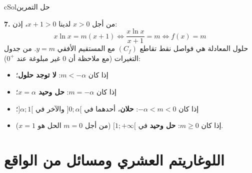 \documentclass[12pt,a4paper]{article}
\newcounter{exo}
\newenvironment{hal}{\Needspace{12\baselineskip}\begin{otherlanguage}{english}\begin{arbox}[breakable]{cSol}{حل التمرين \theexo}}{\end{arbox}\end{otherlanguage}}
\newcommand{\QQ}[1]{\par\smallskip\textbf{#1.} }
\begin{document}
\begin{hal}
\QQ{7} من أجل $x>0$ لدينا $x+1>0$، إذن:
\[x\ln x=m(x+1)\iff\frac{x\ln x}{x+1}=m\iff f(x)=m\]
حلول المعادلة هي فواصل نقط تقاطع $(C_f)$ مع المستقيم الأفقي $y=m$. من جدول التغيرات (مع ملاحظة أن $0$ غير مبلوغة عند $0^+$):
\begin{itemize}
\item إذا كان $m<-\alpha$: \textbf{لا توجد حلول}؛
\item إذا كان $m=-\alpha$: \textbf{حل وحيد $x=\alpha$}؛
\item إذا كان $-\alpha<m<0$: \textbf{حلان}، أحدهما في $]0;\alpha[$ والآخر في $]\alpha;1[$؛
\item إذا كان $m\geqslant0$: \textbf{حل وحيد} في $[1;+\infty[$ (من أجل $m=0$ الحل هو $x=1$).
\end{itemize}
\end{hal}

\section{اللوغاريتم العشري ومسائل من الواقع}
\end{document}
